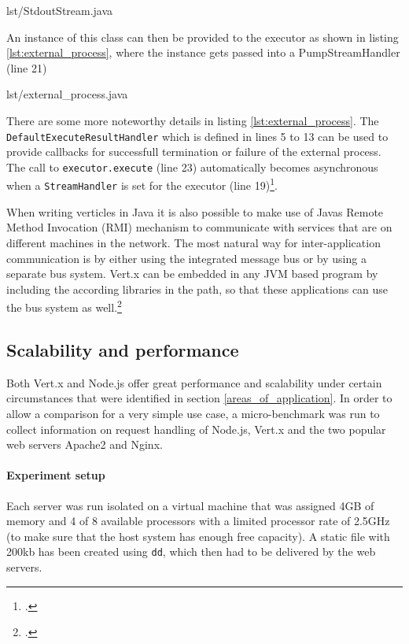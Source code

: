 %
{lst/StdoutStream.java}

An instance of this class can then be provided to the executor as shown in
listing \ref{lst:external_process}, where the instance gets passed into a PumpStreamHandler (line 21)

%
{lst/external_process.java}

There are some more noteworthy details in listing \ref{lst:external_process}.
The \texttt{DefaultExecuteResultHandler} which is defined in lines 5 to
13 can be used to provide callbacks for successfull termination or failure of
the external process. The call to \texttt{executor.execute} (line 23) automatically becomes
asynchronous when a \texttt{StreamHandler} is set for the executor (line 19)\footcite[Cf.][]{apache_2010}.



When writing verticles in Java it is also possible to make use of Javas Remote
Method Invocation (RMI) mechanism to communicate with services that are on different
machines in the network.
The most natural way for inter-application communication is by either using the
integrated message bus or by using a separate bus system.
Vert.x can be embedded in any JVM based program by including the according
libraries in the path, so that these applications can use the bus system as
well.\footcite[Cf.][]{vertx_2012}



\subsection{Scalability and performance}
\label{scalability}



Both Vert.x and Node.js offer great performance and scalability under certain circumstances that were identified in section \ref{areas_of_application}.
In order to allow a comparison for a very simple use case, a micro-benchmark was run to collect information on request handling of Node.js, Vert.x and
the two popular web servers Apache2 and Nginx.
\paragraph{Experiment setup} Each server was run isolated on a virtual machine
that was assigned 4GB of memory and 4 of 8 available processors with a limited processor rate
of 2.5GHz (to make sure that the host system has enough free capacity). A static
file with 200kb has been created using \texttt{dd}, which then had to be
delivered by the web servers.

